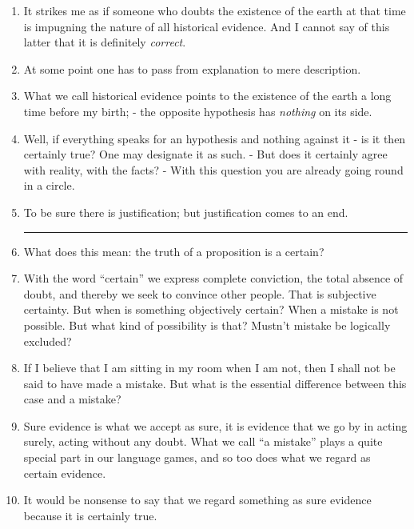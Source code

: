 \documentclass{book}
\begin{document}
\begin{enumerate}
\item
It strikes me as if someone who doubts the existence of the earth at that time
is impugning the nature of all historical evidence. And I cannot say of this
latter that it is definitely \emph{correct}.

\item
At some point one has to pass from explanation to mere description.

\item
What we call historical evidence points to the existence of the earth a long
time before my birth; - the opposite hypothesis has \emph{nothing} on its side.

\item
Well, if everything speaks for an hypothesis and nothing against it - is it
then certainly true? One may designate it as such. - But does it certainly
agree with reality, with the facts? - With this question you are already going
round in a circle.

\item
To be sure there is justification; but justification comes to an end.

\begin{center}\rule{0.5\linewidth}{\linethickness}\end{center}

\item
What does this mean: the truth of a proposition is a certain?

\item
With the word ``certain'' we express complete conviction, the total absence of
doubt, and thereby we seek to convince other people. That is subjective
certainty.  But when is something objectively certain? When a mistake is not
possible. But what kind of possibility is that? Mustn't mistake be logically
excluded?

\item
If I believe that I am sitting in my room when I am not, then I shall not be
said to have made a mistake. But what is the essential difference between this
case and a mistake?

\item
Sure evidence is what we accept as sure, it is evidence that we go by in acting
surely, acting without any doubt.  What we call ``a mistake'' plays a quite
special part in our language games, and so too does what we regard as certain
evidence.

\item
It would be nonsense to say that we regard something as sure evidence because
it is certainly true.


\end{enumerate}
\end{document}
